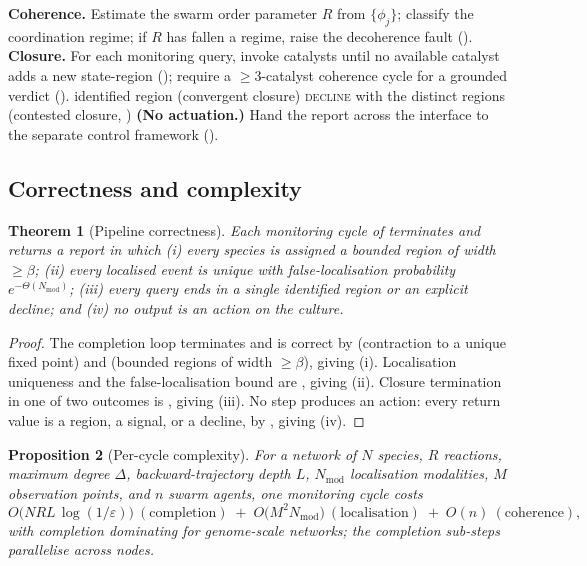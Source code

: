 \documentclass[11pt,twocolumn,a4paper]{article}
\theoremstyle{thmstyle}
\newtheorem{theorem}{Theorem}[section]
\newtheorem{proposition}[theorem]{Proposition}
\theoremstyle{definition}
\theoremstyle{remark}
\newcommand{\floorc}{\beta}
\newcommand{\Rens}{R}
\newcommand{\eps}{\varepsilon}
\begin{document}
\begin{algorithm}[t]
\begin{algorithmic}[1]
\State \textbf{Coherence.} Estimate the swarm order parameter $\Rens$ from
$\{\phi_j\}$; classify the coordination regime; if $\Rens$ has fallen a
regime, raise the decoherence fault ().
\State \textbf{Closure.} For each monitoring query, invoke catalysts until
no available catalyst adds a new state-region (); require
a $\ge3$-catalyst coherence cycle for a grounded verdict
().
   \State \Return identified region (convergent closure)
\Else
   \State \Return \textsc{decline} with the distinct regions (contested
   closure, )
\EndIf
\State \textbf{(No actuation.)} Hand the report across the interface to the
separate control framework ().
\end{algorithmic}
\end{algorithm}

\subsection{Correctness and complexity}

\begin{theorem}[Pipeline correctness]
\label{thm:pipeline-correct}
Each monitoring cycle of  terminates and returns a report
in which (i) every species is assigned a bounded region of width
$\ge\floorc$; (ii) every localised event is unique with false-localisation
probability $e^{-\Theta(N_{\mathrm{mod}})}$; (iii) every query ends in a
single identified region or an explicit decline; and (iv) no output is an
action on the culture.
\end{theorem}

\begin{proof}
The completion loop terminates and is correct by 
(contraction to a unique fixed point) and  (bounded
regions of width $\ge\floorc$), giving (i). Localisation uniqueness and the
false-localisation bound are , giving (ii). Closure
termination in one of two outcomes is , giving (iii). No
step produces an action: every return value is a region, a signal, or a
decline, by , giving (iv).
\end{proof}

\begin{proposition}[Per-cycle complexity]
\label{prop:complexity}
For a network of $N$ species, $R$ reactions, maximum degree $\Delta$,
backward-trajectory depth $L$, $N_{\mathrm{mod}}$ localisation modalities,
$M$ observation points, and $n$ swarm agents, one monitoring cycle costs
\[
O\!\bigl(N R L\,\log(1/\eps)\bigr)\ (\text{completion})
\;+\;O\!\bigl(M^2 N_{\mathrm{mod}}\bigr)\ (\text{localisation})
\;+\;O(n)\ (\text{coherence}),
\]
with completion dominating for genome-scale networks; the completion
sub-steps parallelise across nodes.
\end{proposition}
\end{document}
